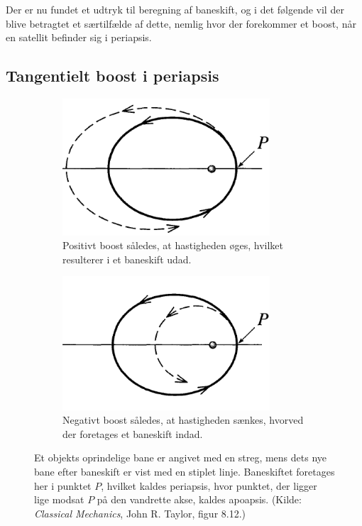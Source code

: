 \noindent
Der er nu fundet et udtryk til beregning af baneskift, og i det følgende vil der blive betragtet et særtilfælde af dette, nemlig hvor der forekommer et boost, når en satellit befinder sig i periapsis.


\subsection{Tangentielt boost i periapsis}

\begin{figure}
	\centering
	\begin{subfigure}{0.45\textwidth}
		\centering
		\includegraphics[width=0.85\textwidth]{Planetbevaegelse/Forward_thrust.png}
		\caption{Positivt boost således, at hastigheden øges, hvilket resulterer i et baneskift udad.}
		\label{fig:Forward_thrust}
	\end{subfigure}
	\hspace{5mm}
	\begin{subfigure}{0.45\textwidth}
		\centering
		\includegraphics[width=0.85\textwidth]{Planetbevaegelse/Backward_thrust.png}
		\caption{Negativt boost således, at hastigheden sænkes, hvorved der foretages et baneskift indad.}
		\label{fig:Backward_thrust}
	\end{subfigure}
	\caption{Et objekts oprindelige bane er angivet med en streg, mens dets nye bane efter baneskift er vist med en stiplet linje. Baneskiftet foretages her i punktet $P$, hvilket kaldes periapsis, hvor punktet, der ligger lige modsat $P$ på den vandrette akse, kaldes apoapsis. (Kilde: \textit{Classical Mechanics}, John R. Taylor, figur 8.12.)}
	\label{fig:Boost_Forward_Backward}
\end{figure}

